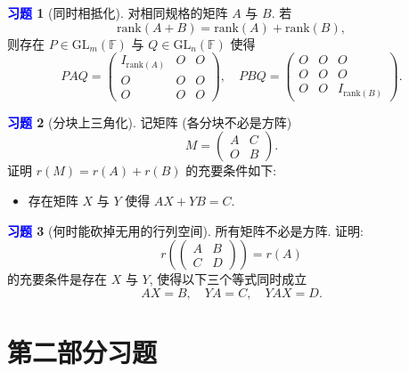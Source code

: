 \documentclass[11pt]{ctexart}
\theoremstyle{definition}
\numberwithin{equation}{section}
\theoremstyle{definition}
\newtheorem{exercise}{\textcolor{blue}{习题}}
\theoremstyle{remark}
\begin{document}
\begin{exercise}[同时相抵化] 对相同规格的矩阵 $A$ 与 $B$. 若
    \begin{equation}
        \mathrm{rank}(A+B)=\mathrm{rank}(A)+\mathrm{rank}(B),
    \end{equation}
    则存在 $P\in \mathrm{GL}_m(\mathbb F)$ 与 $Q\in \mathrm{GL}_n(\mathbb F)$ 使得 
    \begin{equation}
        PAQ=\begin{pmatrix}I_{\mathrm{rank}(A)}&O&O\\O&O&O\\O&O&O\end{pmatrix},\quad PBQ=\begin{pmatrix}O&O&O\\O&O&O\\O&O&I_{\mathrm{rank}(B)}\end{pmatrix}.
    \end{equation}
\end{exercise}

\begin{exercise}[分块上三角化] 
    记矩阵 (各分块不必是方阵)
\begin{equation}
    M=\begin{pmatrix}A&C\\O&B\end{pmatrix}.
\end{equation} 
证明 $r(M)=r(A)+r(B)$ 的充要条件如下: 
\begin{itemize}
    \item 存在矩阵 $X$ 与 $Y$ 使得 $AX+YB=C$.
\end{itemize}
\end{exercise}

\begin{exercise}[何时能砍掉无用的行列空间]
    所有矩阵不必是方阵. 证明: 
    \begin{equation}
        r\left(\begin{pmatrix}
            A&B\\C&D
            \end{pmatrix}\right)=r(A)
    \end{equation}
    的充要条件是存在 $X$ 与 $Y$, 使得以下三个等式同时成立
\begin{equation}
    AX=B,\quad YA=C,\quad YAX=D.
\end{equation}
\end{exercise}

\section{第二部分习题}
\end{document}
